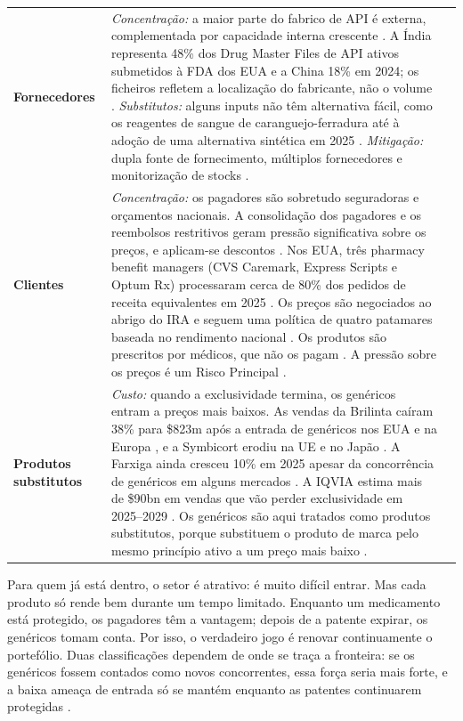 \begin{xltabular}{\linewidth}{@{}N{2.5cm}Yp{2.3cm}@{}}
\textbf{Fornecedores} & \textit{Concentração:} a maior parte do fabrico de API é externa, complementada por capacidade interna crescente \cite[p.~33]{AR}. A Índia representa 48\% dos Drug Master Files de API ativos submetidos à FDA dos EUA e a China 18\% em 2024; os ficheiros refletem a localização do fabricante, não o volume \cite{USP}. \textit{Substitutos:} alguns inputs não têm alternativa fácil, como os reagentes de sangue de caranguejo-ferradura até à adoção de uma alternativa sintética em 2025 \cite[p.~45]{AR}. \textit{Mitigação:} dupla fonte de fornecimento, múltiplos fornecedores e monitorização de stocks \cite[p.~48]{AR}. &  \\
\textbf{Clientes} & \textit{Concentração:} os pagadores são sobretudo seguradoras e orçamentos nacionais. A consolidação dos pagadores e os reembolsos restritivos geram pressão significativa sobre os preços, e aplicam-se descontos \cite[p.~32]{AR}. Nos EUA, três pharmacy benefit managers (CVS Caremark, Express Scripts e Optum Rx) processaram cerca de 80\% dos pedidos de receita equivalentes em 2025 \cite{FEIN}. Os preços são negociados ao abrigo do IRA \cite[p.~33]{AR} e seguem uma política de quatro patamares baseada no rendimento nacional \cite[p.~41]{AR}. Os produtos são prescritos por médicos, que não os pagam \cite[p.~32]{AR}. A pressão sobre os preços é um Risco Principal \cite[p.~48]{AR}. &  \\
\textbf{Produtos substitutos} & \textit{Custo:} quando a exclusividade termina, os genéricos entram a preços mais baixos. As vendas da Brilinta caíram 38\% para \$823m após a entrada de genéricos nos EUA e na Europa \cite[pp.~18, 56]{AR}, e a Symbicort erodiu na UE e no Japão \cite[p.~20]{AR}. A Farxiga ainda cresceu 10\% em 2025 apesar da concorrência de genéricos em alguns mercados \cite[p.~56]{AR}. A IQVIA estima mais de \$90bn em vendas que vão perder exclusividade em 2025--2029 \cite{IQVIA}. Os genéricos são aqui tratados como produtos substitutos, porque substituem o produto de marca pelo mesmo princípio ativo a um preço mais baixo \cite[p.~24]{PLAN}. &  \\
\end{xltabular}

\begin{analysis}
Para quem já está dentro, o setor é atrativo: é muito difícil entrar. Mas cada produto só rende bem durante um tempo limitado. Enquanto um medicamento está protegido, os pagadores têm a vantagem; depois de a patente expirar, os genéricos tomam conta. Por isso, o verdadeiro jogo é renovar continuamente o portefólio. Duas classificações dependem de onde se traça a fronteira: se os genéricos fossem contados como novos concorrentes, essa força seria mais forte, e a baixa ameaça de entrada só se mantém enquanto as patentes continuarem protegidas \cite[p.~49]{AR}.
\end{analysis}

